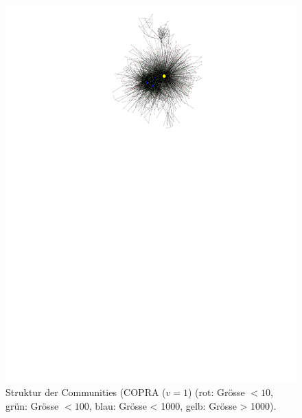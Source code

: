 \begin{figure}[h!]
  \centering
  \includegraphics[scale=2]{images/metagraph-copra1-minsize5.pdf}
  \caption{Struktur der Communities (COPRA ($v=1$) (rot: Gr\"osse
    $<10$, gr\"un: Gr\"osse $<100$, blau: Gr\"osse < 1000, gelb:
    Gr\"osse > 1000).}
  \label{fig:metagraph-com-copra}
\end{figure}

